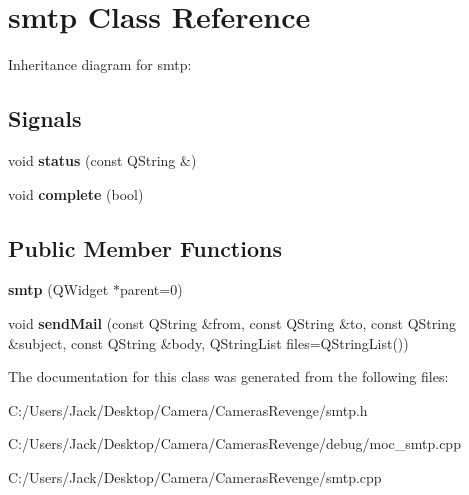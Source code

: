 \hypertarget{classsmtp}{\section{smtp Class Reference}
\label{classsmtp}
}


Inheritance diagram for smtp\+:
\subsection*{Signals}
\begin{DoxyCompactItemize}
\item 
\hypertarget{classsmtp_ac46978cccdda25f823831c380f1c7bf2}{void {\bfseries status} (const Q\+String \&)}\label{classsmtp_ac46978cccdda25f823831c380f1c7bf2}

\item 
\hypertarget{classsmtp_a674ca614f319eed1bca28096971ef1f5}{void {\bfseries complete} (bool)}\label{classsmtp_a674ca614f319eed1bca28096971ef1f5}

\end{DoxyCompactItemize}
\subsection*{Public Member Functions}
\begin{DoxyCompactItemize}
\item 
\hypertarget{classsmtp_ae22c9fda5951fb20bb1f8738158964bf}{{\bfseries smtp} (Q\+Widget $\ast$parent=0)}\label{classsmtp_ae22c9fda5951fb20bb1f8738158964bf}

\item 
\hypertarget{classsmtp_a59a8787485c8145fe99fc92ba9b11706}{void {\bfseries send\+Mail} (const Q\+String \&from, const Q\+String \&to, const Q\+String \&subject, const Q\+String \&body, Q\+String\+List files=Q\+String\+List())}\label{classsmtp_a59a8787485c8145fe99fc92ba9b11706}

\end{DoxyCompactItemize}


The documentation for this class was generated from the following files\+:\begin{DoxyCompactItemize}
\item 
C\+:/\+Users/\+Jack/\+Desktop/\+Camera/\+Cameras\+Revenge/smtp.\+h\item 
C\+:/\+Users/\+Jack/\+Desktop/\+Camera/\+Cameras\+Revenge/debug/moc\+\_\+smtp.\+cpp\item 
C\+:/\+Users/\+Jack/\+Desktop/\+Camera/\+Cameras\+Revenge/smtp.\+cpp\end{DoxyCompactItemize}

